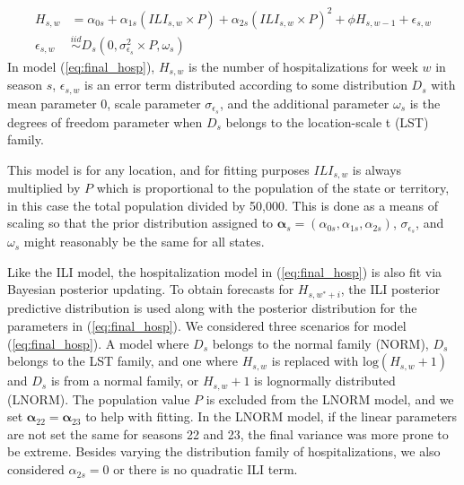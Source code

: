 \documentclass[ba]{imsart}
\theoremstyle{plain}
\theoremstyle{definition}
\theoremstyle{remark}
\begin{document}
\begin{equation}
    \begin{aligned}
    \label{eq:final_hosp}
    H_{s,w} &= \alpha_{0s} + \alpha_{1s} (ILI_{s,w} \times P) + \alpha_{2s} (ILI_{s,w} \times P)^2 + \phi H_{s,w-1} + \epsilon_{s,w}\\ 
    \epsilon_{s,w} &\overset{iid}{\sim} D_s(0, \sigma_{\epsilon_s}^2 \times P, \omega_s) %
    \end{aligned}
\end{equation}
In model (\ref{eq:final_hosp}), $H_{s,w}$ is the number of hospitalizations for week $w$ in season $s$, $\epsilon_{s,w}$ is an error term distributed according to some distribution $D_s$ with mean parameter 0, scale parameter $\sigma_{\epsilon_s}$, and the additional parameter $\omega_s$ is the degrees of freedom parameter when $D_s$ belongs to the location-scale t (LST) family.  



This model is for any location, and for fitting purposes $ILI_{s,w}$ is always multiplied by $P$ which is proportional to the population of the state or territory, in this case the total population divided by 50,000. This is done as a means of scaling so that the prior distribution assigned to  $\boldsymbol{\alpha}_s = (\alpha_{0s}, \alpha_{1s}, \alpha_{2s})$, $\sigma_{\epsilon_s}$, and $\omega_s$ might reasonably be the same for all states.


Like the ILI model, the hospitalization model in (\ref{eq:final_hosp}) is also fit via Bayesian posterior updating. To obtain forecasts for $H_{s, w^* + i}$, the ILI posterior predictive distribution is used along with the posterior distribution for the parameters in (\ref{eq:final_hosp}). We considered three scenarios for model (\ref{eq:final_hosp}). A model where $D_s$ belongs to the normal family (NORM), $D_s$ belongs to the LST family, and one where $H_{s,w}$ is replaced with $\text{log}(H_{s,w} + 1)$ and $D_s$ is from a normal family, or $H_{s,w} + 1$ is lognormally distributed (LNORM). The population value $P$ is excluded from the LNORM model, and we set $\boldsymbol{\alpha}_{22} = \boldsymbol{\alpha}_{23}$ to help with fitting. In the LNORM model, if the linear parameters are not set the same for seasons 22 and 23, the final variance was more prone to be extreme. Besides varying the distribution family of hospitalizations, we also considered $\alpha_{2s} = 0$ or there is no quadratic ILI term.
\end{document}
